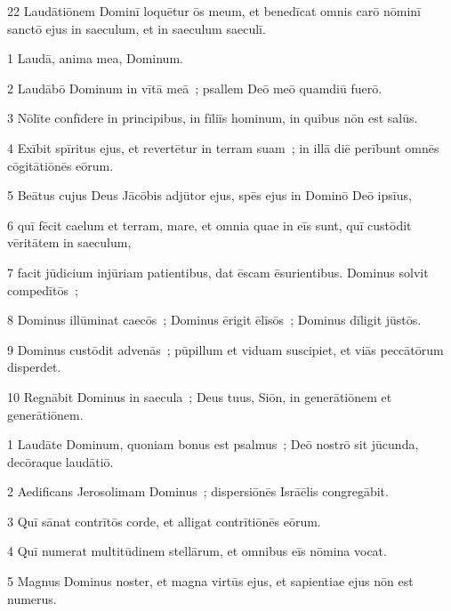 \psalmVerse
  {\phantom{0}22}
  {Laudātiōnem Dominī loquētur ōs meum, et benedīcat omnis carō nōminī sanctō ejus in saeculum, et in saeculum saeculī.}




\psalmVerse
  {\phantom{00}1}
  {Laudā, anima mea, Dominum.}


\psalmVerse
  {\phantom{00}2}
  {Laudābō Dominum in vītā meā~; psallem Deō meō quamdiū fuerō.}


\psalmVerse
  {\phantom{00}3}
  {Nōlīte confīdere in principibus, in fīliīs hominum, in quibus nōn est salūs.}


\psalmVerse
  {\phantom{00}4}
  {Exībit spīritus ejus, et revertētur in terram suam~; in illā diē perībunt omnēs cōgitātiōnēs eōrum.}


\psalmVerse
  {\phantom{00}5}
  {Beātus cujus Deus Jācōbis adjūtor ejus, spēs ejus in Dominō Deō ipsīus,}


\psalmVerse
  {\phantom{00}6}
  {quī fēcit caelum et terram, mare, et omnia quae in eīs sunt, quī custōdit vēritātem in saeculum,}


\psalmVerse
  {\phantom{00}7}
  {facit jūdicium injūriam patientibus, dat ēscam ēsurientibus. Dominus solvit compedītōs~;}


\psalmVerse
  {\phantom{00}8}
  {Dominus illūminat caecōs~; Dominus ērigit ēlīsōs~; Dominus dīligit jūstōs.}


\psalmVerse
  {\phantom{00}9}
  {Dominus custōdit advenās~; pūpillum et viduam suscipiet, et viās peccātōrum disperdet.}


\psalmVerse
  {\phantom{0}10}
  {Regnābit Dominus in saecula~; Deus tuus, Siōn, in generātiōnem et generātiōnem.}



\psalmVerse
  {\phantom{00}1}
  {Laudāte Dominum, quoniam bonus est psalmus~; Deō nostrō sit jūcunda, decōraque laudātiō.}


\psalmVerse
  {\phantom{00}2}
  {Aedificans Jerosolimam Dominus~; dispersiōnēs Isrāēlis congregābit.}


\psalmVerse
  {\phantom{00}3}
  {Quī sānat contrītōs corde, et alligat contrītiōnēs eōrum.}


\psalmVerse
  {\phantom{00}4}
  {Quī numerat multitūdinem stellārum, et omnibus eīs nōmina vocat.}


\psalmVerse
  {\phantom{00}5}
  {Magnus Dominus noster, et magna virtūs ejus, et sapientiae ejus nōn est numerus.}


